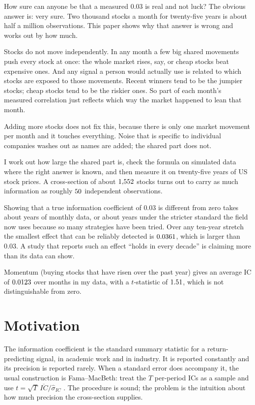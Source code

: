 \documentclass[11pt,a4paper]{article}
\begin{document}
How sure can anyone be that a measured $0.03$ is real and not luck? The obvious answer
is: very sure. Two thousand stocks a month for twenty-five years is about half a
million observations. This paper shows why that answer is wrong and works out by how
much.

Stocks do not move independently. In any month a few big shared movements push every
stock at once: the whole market rises, say, or cheap stocks beat expensive ones. And
any signal a person would actually use is related to which stocks are exposed to those
movements. Recent winners tend to be the jumpier stocks; cheap stocks tend to be the
riskier ones. So part of each month's measured correlation just reflects which way
the market happened to lean that month.

Adding more stocks does not fix this, because there is only one market movement per
month and it touches everything. Noise that is specific to individual companies washes out as names are added; the shared part does not.

I work out how large the shared part is, check the formula on simulated data where the
right answer is known, and then measure it on twenty-five years of US stock prices. A
cross-section of about $1{,}552$ stocks turns out to carry as much information as roughly
$50$ independent observations.

Showing that a true information coefficient of $0.03$ is different from zero takes about \reqYsingle{} years of monthly data, or about \reqYhlz{} years under the stricter
standard the field now uses because so many strategies have been tried. Over any
ten-year stretch the smallest effect that can be reliably detected is $0.0361$, which is
larger than $0.03$. A study that reports such an effect ``holds in every decade'' is
claiming more than its data can show.

Momentum (buying stocks that have risen over the past year) gives an average IC of
$0.0123$ over \momT{} months in my data, with a $t$-statistic of $1.51$, which
is not distinguishable from zero.

\section{Motivation}

The information coefficient is the standard summary statistic for a return-predicting
signal, in academic work and in industry. It is reported constantly and its precision is
reported rarely. When a standard error does accompany it, the usual construction is
Fama--MacBeth: treat the $T$ per-period ICs as a sample and use
$t = \sqrt{T}\,\overline{IC}/\hat\sigma_{IC}$ \citep{fama1973risk}. The procedure is sound;
the problem is the intuition about how much precision the cross-section supplies.
\end{document}
